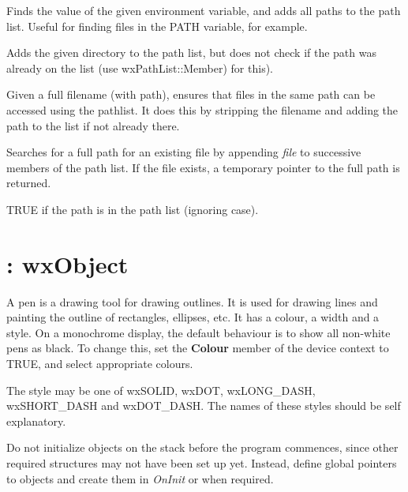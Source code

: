 

Finds the value of the given environment variable, and adds all paths
to the path list. Useful for finding files in the PATH variable, for
example.



Adds the given directory to the path list, but does not
check if the path was already on the list (use wxPathList::Member)
for this).



Given a full filename (with path), ensures that files in the same path
can be accessed using the pathlist. It does this by stripping the
filename and adding the path to the list if not already there.



Searches for a full path for an existing file by appending {\it file} to
successive members of the path list.  If the file exists, a temporary
pointer to the full path is returned.



TRUE if the path is in the path list (ignoring case).

\section{: wxObject}

A pen is a drawing tool for drawing outlines. It is used for drawing
lines and painting the outline of rectangles, ellipses, etc.  It has a
colour, a width and a style. On a monochrome display, the default
behaviour is to show all non-white pens as black. To change this,
set the {\bf Colour} member of the device context to TRUE, and select
appropriate colours.

The style may be one of wxSOLID, wxDOT, wxLONG\_DASH, wxSHORT\_DASH and
wxDOT\_DASH. The names of these styles should be self explanatory.

Do not initialize objects on the stack before the program commences,
since other required structures may not have been set up yet. Instead,
define global pointers to objects and create them in {\it OnInit} or
when required.

